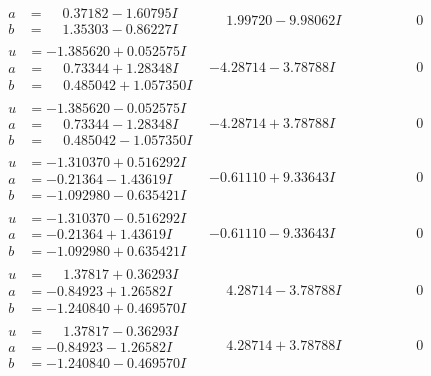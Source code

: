 \documentclass[1p]{elsarticle_modified}
\theoremstyle{definition}
\begin{document}
$$\begin{array}{c|c|c}
\begin{aligned}
a &= \phantom{-}0.37182 - 1.60795 I \\
b &= \phantom{-}1.35303 - 0.86227 I\end{aligned}
 & \phantom{-}1.99720 - 9.98062 I & \phantom{-0.000000 } 0 \\ \hline\begin{aligned}
u &= -1.385620 + 0.052575 I \\
a &= \phantom{-}0.73344 + 1.28348 I \\
b &= \phantom{-}0.485042 + 1.057350 I\end{aligned}
 & -4.28714 - 3.78788 I & \phantom{-0.000000 } 0 \\ \hline\begin{aligned}
u &= -1.385620 - 0.052575 I \\
a &= \phantom{-}0.73344 - 1.28348 I \\
b &= \phantom{-}0.485042 - 1.057350 I\end{aligned}
 & -4.28714 + 3.78788 I & \phantom{-0.000000 } 0 \\ \hline\begin{aligned}
u &= -1.310370 + 0.516292 I \\
a &= -0.21364 - 1.43619 I \\
b &= -1.092980 - 0.635421 I\end{aligned}
 & -0.61110 + 9.33643 I & \phantom{-0.000000 } 0 \\ \hline\begin{aligned}
u &= -1.310370 - 0.516292 I \\
a &= -0.21364 + 1.43619 I \\
b &= -1.092980 + 0.635421 I\end{aligned}
 & -0.61110 - 9.33643 I & \phantom{-0.000000 } 0 \\ \hline\begin{aligned}
u &= \phantom{-}1.37817 + 0.36293 I \\
a &= -0.84923 + 1.26582 I \\
b &= -1.240840 + 0.469570 I\end{aligned}
 & \phantom{-}4.28714 - 3.78788 I & \phantom{-0.000000 } 0 \\ \hline\begin{aligned}
u &= \phantom{-}1.37817 - 0.36293 I \\
a &= -0.84923 - 1.26582 I \\
b &= -1.240840 - 0.469570 I\end{aligned}
 & \phantom{-}4.28714 + 3.78788 I & \phantom{-0.000000 } 0 \\ \hline\begin{aligned}

\end{aligned}
\end{array}$$
\end{document}
